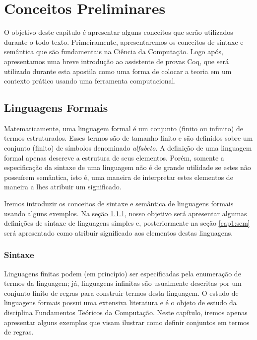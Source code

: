 \chapter{Conceitos Preliminares}\label{cap1}

O objetivo deste cap\'itulo \'e apresentar alguns conceitos que ser\~ao utilizados durante o todo texto. Primeiramente,
apresentaremos os conceitos de sintaxe e sem\^antica que s\~ao fundamentais na Ci\^encia da Computa\c{c}\~ao. Logo ap\'os,
apresentamos uma breve introdu\c{c}\~ao ao assistente de provas Coq, que ser\'a utilizado durante esta apostila como uma
forma de colocar a teoria em um contexto pr\'atico usando uma ferramenta computacional.

\section{Linguagens Formais}

Matematicamente, uma linguagem formal \'e um conjunto (finito ou infinito) de termos estruturados. Esses
termos s\~ao de tamanho finito e s\~ao definidos sobre um conjunto (finito) de s\'imbolos denominado \textit{alfabeto}.
A defini\c{c}\~ao de uma linguagem formal apenas descreve a estrutura de seus elementos. Por\'em, somente a especifica\c{c}\~ao
da sintaxe de uma linguagem n\~ao \'e de grande utilidade se estes n\~ao possu\'irem sem\^antica, isto \'e, uma maneira de
interpretar estes elementos de maneira a lhes atribuir um significado. 

Iremos introduzir os conceitos de sintaxe e sem\^antica de linguagens formais usando alguns exemplos.
Na se\c{c}\~ao \ref{cap1:syn}, nosso objetivo ser\'a apresentar
algumas defini\c{c}\~oes de sintaxe de linguagens simples e, posteriormente na se\c{c}\~ao \ref{cap1:sem} ser\'a apresentado como
atribuir significado aos elementos destas linguagens.

\subsection{Sintaxe}\label{cap1:syn}

Linguagens finitas podem (em princ\'ipio) ser especificadas pela enumera\c{c}\~ao de termos da linguagem; j\'a, linguagens
infinitas s\~ao usualmente descritas por um conjunto finito de regras para construir termos desta linguagem.
O estudo de linguagens formais possui uma extensiva literatura e \'e o objeto de estudo da disciplina Fundamentos Te\'oricos da Computa\c{c}\~ao.
Neste cap\'itulo, iremos apenas apresentar alguns exemplos que visam ilustrar como definir conjuntos em termos de regras.

